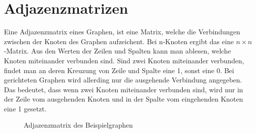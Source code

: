 \documentclass{article}
\begin{document}
    \section{Adjazenzmatrizen}
    Eine Adjazenzmatrix eines Graphen, ist eine Matrix, welche die Verbindungen zwischen der Knoten des Graphen aufzeichent.
    Bei n-Knoten ergibt das eine \(n\times n\)-Matrix.
    Aus den Werten der Zeilen und Spalten kann man ablesen, welche Knoten miteinander verbunden sind.
    Sind zwei Knoten miteinander verbunden, findet man an deren Kreuzung von Zeile und Spalte eine 1, sonst eine 0.
    Bei gerichteten Graphen wird allerding nur die ausgehende Verbindung angegeben.
    Das bedeutet, dass wenn zwei Knoten miteinander verbunden sind, wird nur in der Zeile vom ausgehenden Knoten und in der Spalte vom eingehenden Knoten eine 1 gesetzt.

    \begin{figure}[h!]
        \centering
        \caption{Adjazenzmatrix des Beispielgraphen}
    \end{figure}
\end{document}

